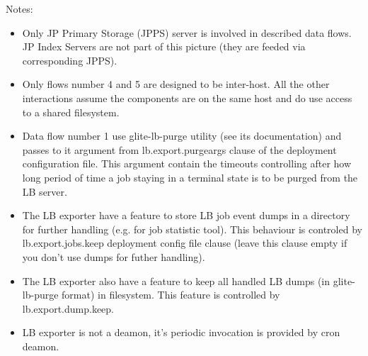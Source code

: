\documentclass{egee}
\begin{document}
Notes:
\begin{itemize}
 \item Only JP Primary Storage (JPPS) server is involved in described
   data flows. JP Index Servers are not part of this picture (they are
   feeded via corresponding JPPS).
 \item Only flows number 4 and 5 are designed to be inter-host. All
   the other interactions assume the components are on the same host and
   do use access to a shared filesystem.
 \item Data flow number 1 use glite-lb-purge utility (see its
   documentation) and passes to it argument from lb.export.purgeargs
   clause of the deployment configuration file. This argument contain
   the timeouts controlling after how long period of time a job
   staying in a terminal state is to be purged from the LB server.
 \item The LB exporter have a feature to store LB job event dumps in a
   directory for further handling (e.g. for job statistic tool). This behaviour
   is controled by lb.export.jobs.keep deployment config file clause (leave
   this clause empty if you don't use dumps for futher handling).
 \item The LB exporter also have a feature to keep all handled LB
   dumps (in glite-lb-purge format) in filesystem. This feature is
   controlled by lb.export.dump.keep.
 \item LB exporter is not a deamon, it's periodic invocation is
   provided by cron deamon.
\end{itemize}
\end{document}
